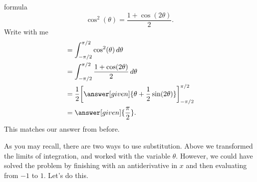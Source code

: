 \documentclass{ximera}
\begin{document}
\begin{example}
\begin{explanation}
    formula
    \[
    \cos^2(\theta)= \frac{1+\cos(2\theta)}{2}.
    \]
    Write with me
    \begin{align*}
      &= \int_{-\pi/2}^{\pi/2} \cos^2(\theta) \d \theta \\
      &= \int_{-\pi/2}^{\pi/2} \frac{1+\cos(2\theta)}{2} \d \theta\\
      &= \frac{1}{2} \eval{\answer[given]{\theta +\frac{1}{2}\sin(2\theta)}}_{-\pi/2}^{\pi/2}\\
      &=\answer[given]{\frac{\pi}{2}}.
    \end{align*}
    This matches our answer from before.
  \end{explanation}
\end{example}

As you may recall, there are two ways to use substitution. Above we
transformed the limits of integration, and worked with the variable
$\theta$. However, we could have solved the problem by finishing with
an antiderivative in $x$ and then evaluating from $-1$ to $1$. Let's
do this.
\end{document}

